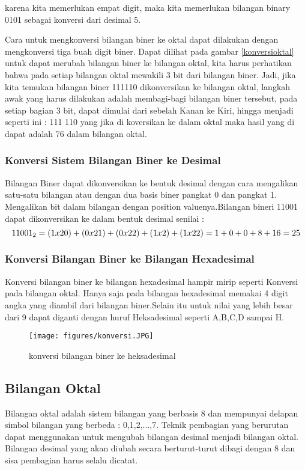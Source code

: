 karena kita memerlukan empat digit, maka kita memerlukan bilangan binary 0101 sebagai konversi dari desimal 5.

Cara untuk mengkonversi bilangan biner ke oktal dapat dilakukan dengan mengkonversi tiga buah digit biner. Dapat dilihat pada gambar \ref{konversioktal} untuk dapat merubah bilangan biner ke bilangan oktal, kita harus perhatikan bahwa pada setiap bilangan oktal mewakili 3 bit dari bilangan biner. Jadi, jika kita temukan bilangan biner 111110 dikonversikan ke bilangan oktal, langkah awak yang harus dilakukan adalah membagi-bagi bilangan biner tersebut, pada setiap bagian 3 bit, dapat dimulai dari sebelah Kanan ke Kiri, hingga menjadi seperti ini : 111 110 yang jika di koversikan ke dalam oktal maka hasil yang di dapat adalah 76 dalam bilangan oktal.

\subsubsection{Konversi Sistem Bilangan Biner ke Desimal}
Bilangan Biner dapat dikonversikan ke bentuk desimal dengan cara mengalikan satu-satu bilangan atau dengan dua basis biner pangkat 0 dan pangkat 1. Mengalikan bit dalam bilangan dengan position valuenya.Bilangan bineri 11001 dapat dikonversikan ke dalam bentuk desimal senilai : \\

\begin{equation}
11001_{2} = (1x20)+(0x21)+(0x22)+(1x2)+(1x22) \\
= 1+0+0+8+16 
= 25
\end{equation}

\subsubsection{Konversi Bilangan Biner ke Bilangan Hexadesimal}
Konversi bilangan biner ke bilangan hexadesimal hampir mirip seperti Konversi pada bilangan oktal. Hanya saja pada bilangan hexadesimal memakai 4 digit angka yang diambil dari bilangan biner.Selain itu untuk nilai yang lebih besar dari 9 dapat diganti dengan huruf Heksadesimal seperti A,B,C,D sampai H. 

\begin{figure}[ht]
\centerline{\texttt{[image: figures/konversi.JPG]}}
\caption{konversi bilangan biner ke heksadesimal}
\label{konversi}
\end {figure}

\subsection{Bilangan Oktal}
Bilangan oktal adalah sistem bilangan yang berbasis 8 dan mempunyai delapan simbol bilangan yang berbeda : 0,1,2,...,7.
Teknik pembagian yang berurutan dapat menggunakan untuk mengubah bilangan desimal menjadi bilangan oktal. Bilangan desimal yang akan diubah secara berturut-turut dibagi dengan 8 dan sisa pembagian harus selalu dicatat. 
